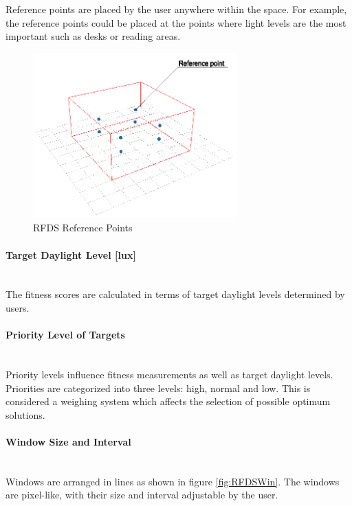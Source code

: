 Reference points are placed by the user anywhere within the space. For example, the reference points could be placed at the points where light levels are the most important such as desks or reading areas.

\begin{figure}[H]
\centering
\includegraphics[width=0.7\textwidth]{./Images/25-RefPoints}
\caption[RFDS Reference Points]{RFDS Reference Points \cite{kawakita08}}
\label{fig:RFDSRefPoints}
\end{figure}

\paragraph{Target Daylight Level [lux]}\mbox{}\\

The fitness scores are calculated in terms of target daylight levels determined by users.

\paragraph{Priority Level of Targets}\mbox{}\\

Priority levels influence fitness measurements as well as target daylight levels. Priorities are categorized into three levels: high, normal and low. This is considered a weighing system which affects the selection of possible optimum solutions.

\paragraph{Window Size and Interval}\mbox{}\\

Windows are arranged in lines as shown in figure \ref{fig:RFDSWin}. The windows are pixel-like, with their size and interval adjustable by the user.

